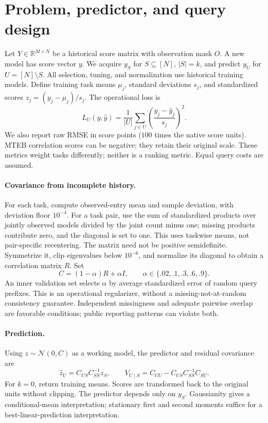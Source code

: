 \documentclass{article}
\newcommand{\R}{\mathbb{R}}
\begin{document}
\section{Problem, predictor, and query design}
\label{sec:method}
Let $Y\in\R^{M\times N}$ be a historical score matrix with observation mask $O$. A new model has score vector $y$. We acquire $y_S$ for $S\subseteq[N]$, $|S|=k$, and predict $y_U$ for $U=[N]\setminus S$. All selection, tuning, and normalization use historical training models. Define training task means $\mu_j$, standard deviations $s_j$, and standardized scores $z_j=(y_j-\mu_j)/s_j$. The operational loss is
\begin{equation}
 L_U(y,\hat y)=\frac1{|U|}\sum_{j\in U}\left(\frac{y_j-\hat y_j}{s_j}\right)^2.
 \label{eq:loss}
\end{equation}
We also report raw RMSE in score points ($100$ times the native score units). MTEB correlation scores can be negative; they retain their original scale. These metrics weight tasks differently; neither is a ranking metric. Equal query costs are assumed.

\paragraph{Covariance from incomplete history.}
For each task, compute observed-entry mean and sample deviation, with deviation floor $10^{-4}$. For a task pair, use the sum of standardized products over jointly observed models divided by the joint count minus one; missing products contribute zero, and the diagonal is set to one. This uses taskwise means, not pair-specific recentering. The matrix need not be positive semidefinite. Symmetrize it, clip eigenvalues below $10^{-6}$, and normalize its diagonal to obtain a correlation matrix $R$. Set
\begin{equation}
 C=(1-\alpha)R+\alpha I,\qquad \alpha\in\{.02,.1,.3,.6,.9\}.
 \label{eq:cov}
\end{equation}
An inner validation set selects $\alpha$ by average standardized error of random query prefixes. This is an operational regularizer, without a missing-not-at-random consistency guarantee. Independent missingness and adequate pairwise overlap are favorable conditions; public reporting patterns can violate both.

\paragraph{Prediction.}
Using $z\sim\mathcal N(0,C)$ as a working model, the predictor and residual covariance are
\begin{equation}
 \hat z_U=C_{US}C_{SS}^{-1}z_S,\qquad
 V_{U\mid S}=C_{UU}-C_{US}C_{SS}^{-1}C_{SU}.
 \label{eq:conditional}
\end{equation}
For $k=0$, return training means. Scores are transformed back to the original units without clipping. The predictor depends only on $y_S$. Gaussianity gives a conditional-mean interpretation; stationary first and second moments suffice for a best-linear-prediction interpretation.
\end{document}
